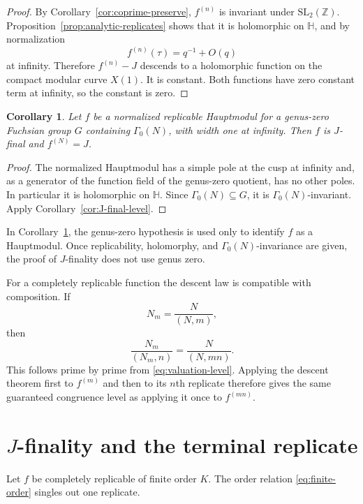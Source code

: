 \documentclass[12pt]{amsart}
\newtheorem{cor}[thm]{Corollary}
\theoremstyle{definition}
\theoremstyle{remark}
\numberwithin{equation}{section}
\newcommand{\Hh}{\mathbb H}
\newcommand{\Z}{\mathbb Z}
\begin{document}
\begin{proof}
By Corollary~\ref{cor:coprime-preserve}, $f^{(n)}$ is invariant under $\mathrm{SL}_2(\Z)$. Proposition~\ref{prop:analytic-replicates} shows that it is holomorphic on $\Hh$, and by normalization
\[
f^{(n)}(\tau)=q^{-1}+O(q)
\]
at infinity. Therefore $f^{(n)}-J$ descends to a holomorphic function on the compact modular curve $X(1)$. It is constant. Both functions have zero constant term at infinity, so the constant is zero.
\end{proof}

\begin{cor}\label{cor:Hauptmodul-note}
Let $f$ be a normalized replicable Hauptmodul for a genus-zero Fuchsian group $G$ containing $\Gamma_0(N)$, with width one at infinity. Then $f$ is $J$-final and $f^{(N)}=J$.
\end{cor}

\begin{proof}
The normalized Hauptmodul has a simple pole at the cusp at infinity and, as a generator of the function field of the genus-zero quotient, has no other poles. In particular it is holomorphic on $\Hh$. Since $\Gamma_0(N)\subseteq G$, it is $\Gamma_0(N)$-invariant. Apply Corollary~\ref{cor:J-final-level}.
\end{proof}

In Corollary~\ref{cor:Hauptmodul-note}, the genus-zero hypothesis is used only to identify $f$ as a Hauptmodul. Once replicability, holomorphy, and $\Gamma_0(N)$-invariance are given, the proof of $J$-finality does not use genus zero.

For a completely replicable function the descent law is compatible with composition. If
\[
N_m=\frac{N}{(N,m)},
\]
then
\begin{equation}\label{eq:semigroup-level}
\frac{N_m}{(N_m,n)}
=
\frac{N}{(N,mn)}.
\end{equation}
This follows prime by prime from \eqref{eq:valuation-level}. Applying the descent theorem first to $f^{(m)}$ and then to its $n$th replicate therefore gives the same guaranteed congruence level as applying it once to $f^{(mn)}$.

\section{$J$-finality and the terminal replicate}

Let $f$ be completely replicable of finite order $K$. The order relation \eqref{eq:finite-order} singles out one replicate.
\end{document}
